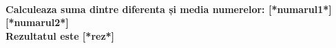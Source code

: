 \documentclass{exam}
\begin{document}
\paragraph{
Calculeaza suma dintre diferenta și media numerelor: [*numarul1*]  [*numarul2*]\\
Rezultatul este [*rez*]
}
\end{document}
